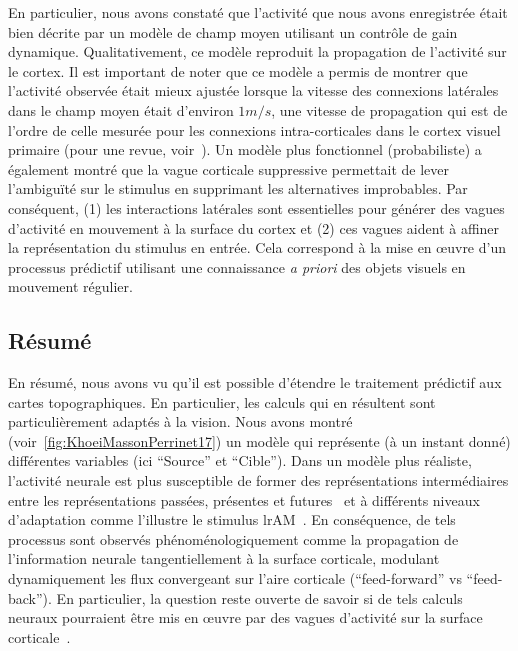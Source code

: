 \documentclass[11pt,french,a4paper,oneside]{article}%
\begin{document}
En particulier, nous avons constaté que l'activité que nous avons
enregistrée était bien décrite par un modèle de champ moyen utilisant un
contrôle de gain dynamique. Qualitativement, ce modèle reproduit la
propagation de l'activité sur le cortex. Il est important de noter que
ce modèle a permis de montrer que l'activité observée était mieux
ajustée lorsque la vitesse des connexions latérales dans le champ moyen
était d'environ $1 m/s$, une vitesse de propagation qui est de l'ordre de
celle mesurée pour les connexions intra-corticales dans le cortex visuel
primaire (pour une revue, voir~\citep{Muller18}). Un modèle plus
fonctionnel (probabiliste) a également montré que la vague
corticale suppressive permettait de lever l'ambiguïté sur le stimulus en supprimant
les alternatives improbables. Par conséquent,
(1) les interactions latérales sont essentielles pour générer des vagues d'activité
en mouvement à la surface du cortex et (2) ces vagues aident à affiner la représentation
du stimulus en entrée. Cela correspond à la mise en œuvre d'un processus
prédictif utilisant une connaissance \emph{a priori} des objets visuels
en mouvement régulier.

\subsection{Résumé}
En résumé, nous avons vu qu'il est possible d'étendre le traitement
prédictif aux cartes topographiques. En particulier, les calculs qui en
résultent sont particulièrement adaptés à la vision. Nous avons montré
(voir~\ref{fig:KhoeiMassonPerrinet17}) un modèle qui représente (à un instant donné) différentes
variables (ici ``Source'' et ``Cible''). Dans un modèle plus réaliste,
l'activité neurale est plus susceptible de former des représentations
intermédiaires entre les représentations passées, présentes et futures~\citep{Glaser18} et à différents niveaux d'adaptation comme
l'illustre le stimulus lrAM~\citep{Chemla19}. En conséquence, de
tels processus sont observés phénoménologiquement comme la propagation
de l'information neurale tangentiellement à la surface corticale,
modulant dynamiquement les flux convergeant sur l'aire corticale (``feed-forward'' vs ``feed-back''). En
particulier, la question reste ouverte de savoir si de tels calculs
neuraux pourraient être mis en œuvre par des vagues d'activité sur la
surface corticale~\citep{Muller18}.
\end{document}

